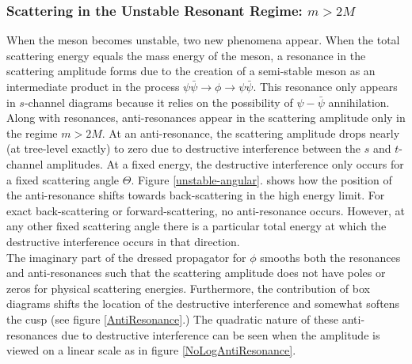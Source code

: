 \documentclass{article}
\begin{document}
\subsubsection{Scattering in the Unstable Resonant Regime: $m > 2 M$}
When the meson becomes unstable, two new phenomena appear. When the total scattering energy equals the mass energy of the meson, a resonance in the scattering amplitude forms due to the creation of a semi-stable meson as an intermediate product in the process $\psi \bar{\psi} \to \phi \to \psi \bar{\psi}$. This resonance only appears in $s$-channel diagrams because it relies on the possibility of $\psi-\bar{\psi}$ annihilation. Along with resonances, anti-resonances appear in the scattering amplitude only in the regime $m > 2 M$. At an anti-resonance, the scattering amplitude drops nearly (at tree-level exactly) to zero due to destructive interference between the $s$ and $t$-channel amplitudes. At a fixed energy, the destructive interference only occurs for a fixed scattering angle $\Theta$. Figure \ref{unstable-angular}. shows how the position of the anti-resonance shifts towards back-scattering in the high energy limit. For exact back-scattering or forward-scattering, no anti-resonance occurs. However, at any other fixed scattering angle there is a particular total energy at which the destructive interference occurs in that direction.\bigskip\\
The imaginary part of the dressed propagator for $\phi$ smooths both the resonances and anti-resonances such that the scattering amplitude does not have poles or zeros for physical scattering energies. Furthermore, the contribution of box diagrams shifts the location of the destructive interference and somewhat softens the cusp (see figure \ref{AntiResonance}.) The quadratic nature of these anti-resonances due to destructive interference can be seen when the amplitude is viewed on a linear scale as in figure \ref{NoLogAntiResonance}.    
\end{document}
